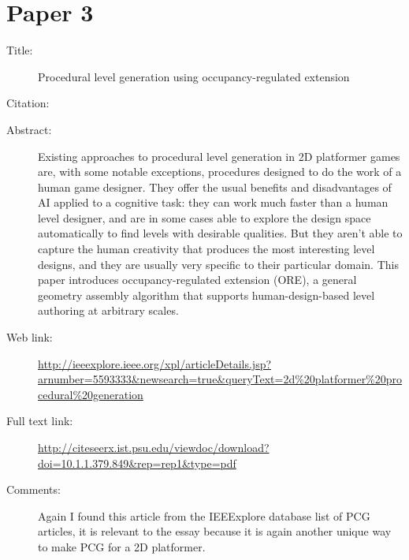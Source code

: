 \documentclass{scrartcl}
\begin{document}
\section*{Paper 3}
\begin{description}
\item[Title:] Procedural level generation using occupancy-regulated extension
\item[Citation:] \cite{mawhorter2010}
\item[Abstract:] Existing approaches to procedural level generation in 2D platformer games are, with some notable exceptions, procedures designed to do the work of a human game designer. They offer the usual benefits and disadvantages of AI applied to a cognitive task: they can work much faster than a human level designer, and are in some cases able to explore the design space automatically to find levels with desirable qualities. But they aren't able to capture the human creativity that produces the most interesting level designs, and they are usually very specific to their particular domain. This paper introduces occupancy-regulated extension (ORE), a general geometry assembly algorithm that supports human-design-based level authoring at arbitrary scales.

\item[Web link:]\url{http://ieeexplore.ieee.org/xpl/articleDetails.jsp?arnumber=5593333&newsearch=true&queryText=2d%20platformer%20procedural%20generation}
\item[Full text link:] \url{http://citeseerx.ist.psu.edu/viewdoc/download?doi=10.1.1.379.849&rep=rep1&type=pdf}
\item[Comments:] Again I found this article from the IEEExplore database list of PCG articles, it is relevant to the essay because it is again another unique way to make PCG for a 2D platformer.
\end{description}
\end{document}
